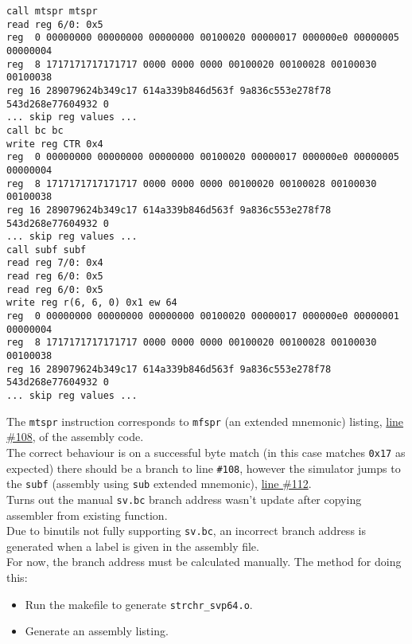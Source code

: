 \begin{verbatim}
call mtspr mtspr
read reg 6/0: 0x5
reg  0 00000000 00000000 00000000 00100020 00000017 000000e0 00000005 00000004
reg  8 1717171717171717 0000 0000 0000 00100020 00100028 00100030 00100038
reg 16 289079624b349c17 614a339b846d563f 9a836c553e278f78 543d268e77604932 0
... skip reg values ...
call bc bc
write reg CTR 0x4
reg  0 00000000 00000000 00000000 00100020 00000017 000000e0 00000005 00000004
reg  8 1717171717171717 0000 0000 0000 00100020 00100028 00100030 00100038
reg 16 289079624b349c17 614a339b846d563f 9a836c553e278f78 543d268e77604932 0
... skip reg values ...
call subf subf
read reg 7/0: 0x4
read reg 6/0: 0x5
read reg 6/0: 0x5
write reg r(6, 6, 0) 0x1 ew 64
reg  0 00000000 00000000 00000000 00100020 00000017 000000e0 00000001 00000004
reg  8 1717171717171717 0000 0000 0000 00100020 00100028 00100030 00100038
reg 16 289079624b349c17 614a339b846d563f 9a836c553e278f78 543d268e77604932 0
... skip reg values ...
\end{verbatim}

The \texttt{mtspr} instruction corresponds to \texttt{mfspr}
(an extended mnemonic) listing,
\href{https://git.vantosh.com/ngisearch/glibc-svp64/src/commit/9378006a84bdef6af85eb0f810fb62fedc62c588/svp64-port/svp64/strchr_svp64.s#L108}{line \#108},
of the assembly code.\\

The correct behaviour is on a successful byte match (in this case
matches \texttt{0x17} as expected) there should be a branch to line
\texttt{\#108}, however the simulator jumps to the \texttt{subf}
(assembly using \texttt{sub} extended mnemonic),
\href{https://git.vantosh.com/ngisearch/glibc-svp64/src/commit/9378006a84bdef6af85eb0f810fb62fedc62c588/svp64-port/svp64/strchr_svp64.s#L112}{line \#112}.\\

Turns out the manual \texttt{sv.bc} branch address wasn't update after
copying assembler from existing function.\\

Due to binutils not fully supporting \texttt{sv.bc}, an incorrect
branch address is generated when a label is given in the assembly file.\\

For now, the branch address must be calculated manually.
The method for doing this:

\begin{itemize}
  \item Run the makefile to generate \texttt{strchr\_svp64.o}.
  \item Generate an assembly listing.
\end{itemize}

